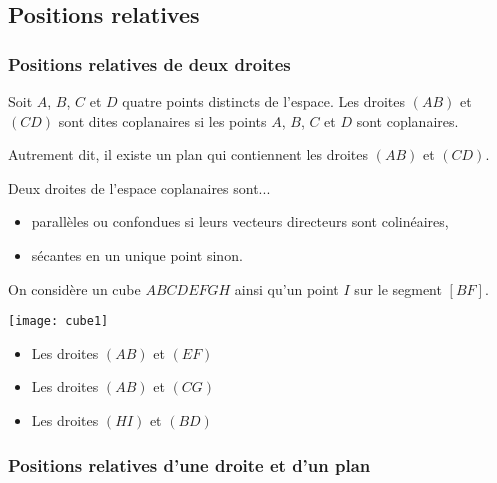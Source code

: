\documentclass[11pt,fleqn, openany]{book} %
\begin{document}
\subsection{Positions relatives}

\subsubsection{Positions relatives de deux droites}

\begin{definition} Soit $A$, $B$, $C$ et $D$ quatre points distincts de l'espace. Les droites $(AB)$ et $(CD)$ sont dites coplanaires si les points $A$, $B$, $C$ et $D$ sont coplanaires.

Autrement dit, il existe un plan qui contiennent les droites $(AB)$ et $(CD)$.\end{definition}

\begin{proposition}Deux droites de l'espace coplanaires sont...
\begin{itemize}
\item parallèles ou confondues si leurs vecteurs directeurs sont colinéaires,
\item sécantes en un unique point sinon.
\end{itemize}\end{proposition}


\begin{example}On considère un cube $ABCDEFGH$ ainsi qu'un point $I$ sur le segment $[BF]$.

\begin{minipage}{0.4\linewidth}
\texttt{[image: cube1]}

\end{minipage}\begin{minipage}{0.6 \linewidth}
\begin{itemize}
\item Les droites $(AB)$ et $(EF)$ 
\item Les droites $(AB)$ et $(CG)$ 
\item Les droites $(HI)$ et $(BD)$ 
\end{itemize}
\end{minipage}

\end{example}



\subsubsection{Positions relatives d'une droite et d'un plan}
\end{document}
